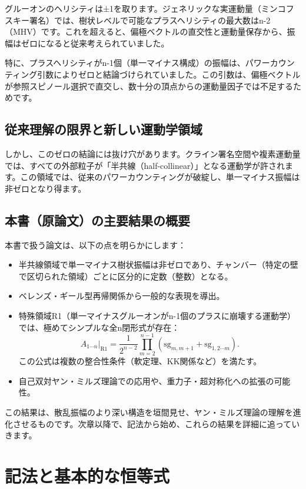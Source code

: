 \documentclass[dvipdfmx,a4paper]{jsbook}
\theoremstyle{definition}
\theoremstyle{remark}
\begin{document}
グルーオンのヘリシティは±1を取ります。ジェネリックな実運動量（ミンコフスキー署名）では、樹状レベルで可能なプラスヘリシティの最大数はn-2（MHV）です。これを超えると、偏極ベクトルの直交性と運動量保存から、振幅はゼロになると従来考えられていました。

特に、プラスヘリシティがn-1個（単一マイナス構成）の振幅は、パワーカウンティング引数によりゼロと結論づけられていました。この引数は、偏極ベクトルが参照スピノール選択で直交し、数十分の頂点からの運動量因子では不足するためです。

\section{従来理解の限界と新しい運動学領域}

しかし、このゼロの結論には抜け穴があります。クライン署名空間や複素運動量では、すべての外部粒子が「半共線（half-collinear）」となる運動学が許されます。この領域では、従来のパワーカウンティングが破綻し、単一マイナス振幅は非ゼロとなり得ます。

\section{本書（原論文）の主要結果の概要}

本書で扱う論文は、以下の点を明らかにします：
\begin{itemize}
  \item 半共線領域で単一マイナス樹状振幅は非ゼロであり、チャンバー（特定の壁で区切られた領域）ごとに区分的に定数（整数）となる。
  \item ベレンズ・ギール型再帰関係から一般的な表現を導出。
  \item 特殊領域R1（単一マイナスグルーオンがn-1個のプラスに崩壊する運動学）では、極めてシンプルな全n閉形式が存在：
  \[
  A_{1 \cdots n}|_{\text{R1}} = \frac{1}{2^{n-2}} \prod_{m=2}^{n-1} \left( \mathrm{sg}_{m,m+1} + \mathrm{sg}_{1,2\cdots m} \right).
  \]
  この公式は複数の整合性条件（軟定理、KK関係など）を満たす。
  \item 自己双対ヤン・ミルズ理論での応用や、重力子・超対称化への拡張の可能性。
\end{itemize}

この結果は、散乱振幅のより深い構造を垣間見せ、ヤン・ミルズ理論の理解を進化させるものです。次章以降で、記法から始め、これらの結果を詳細に追っていきます。

\chapter{記法と基本的な恒等式}
\end{document}
